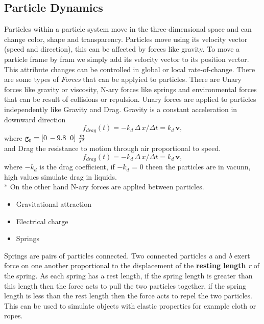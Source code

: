\subsection{Particle Dynamics}
Particles within a particle system move in the three-dimensional space and can change color, shape and transparency. Particles move using its velocity vector (speed and direction), this can be affected by forces like gravity. To move a particle frame by fram we simply add its velocity vector to its position vector. This attribute changes can be controlled in global or local rate-of-change.
	There are some types of \emph{Forces} that can be applyied to particles. There are Unary forces like
gravity or viscosity, N-ary forces like springs and environmental forces that can be result of collisions or repulsion. Unary forces are applied to particles independently like Gravity and Drag. Gravity is a constant acceleration in downward direction 
\begin{equation}
\label{eqn:03}
f_{drag}(t) = -k_{d}\, \Delta\, x / \Delta t = k_{d}\, \textbf{v},
\end{equation}
where $\texttt{g}_{\texttt{0}} = \left [ 0\, -9.8\; \; 0 \right ]\, \frac{\emph{m}}{s^{2}}$
\\
and Drag the resistance to motion through air proportional to speed.
\begin{equation}
\label{eqn:04}
f_{drag}(t) = -k_{d}\, \Delta\, x / \Delta t = k_{d}\, \textbf{v},
\end{equation}
where $-k_{d}$ is the drag coefficient, if $-k_{d}$ = 0 theen the particles are in vacunn, high values simulate drag in liquids.\\*
On the other hand N-ary forces are applied between particles.
\begin{itemize}
\item Gravitational attraction  
\item Electrical charge
\item Springs
\end{itemize}
Springs are pairs of particles connected. Two connected particles \emph{a} and \emph{b} exert force on one another proportional to the displacement of the \textbf{resting length} \emph{r} of the spring. As each spring has a rest length, if the spring length is greater than this length then the force acts to pull the two particles together, if the spring length is less than the rest length then the force acts to repel the two particles. This can be used to simulate objects with elastic properties for example cloth or ropes.

